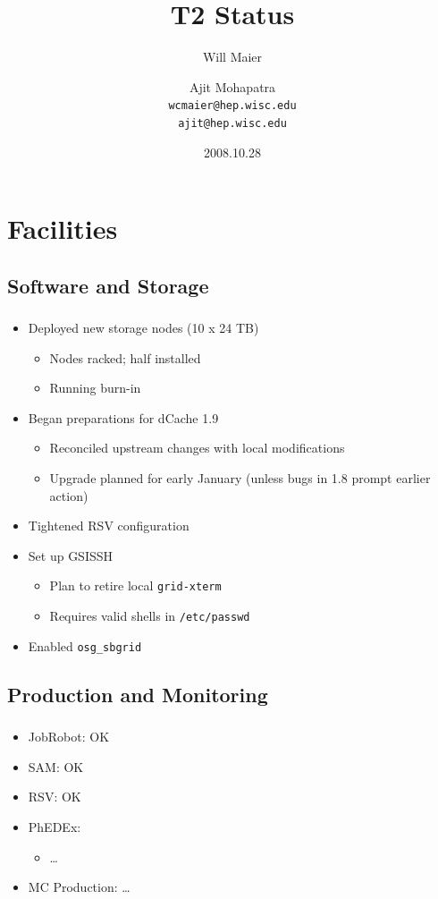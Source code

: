 \documentclass{beamer}
\title{T2 Status}
\author[Maier, Mohapatra]{
    Will Maier \and Ajit Mohapatra\\ 
    {\tt wcmaier@hep.wisc.edu}\\
    {\tt ajit@hep.wisc.edu}}
\institute[Wisconsin]{University of Wisconsin - High Energy Physics}
\date{2008.10.28}
\begin{document}
\begin{frame}
    \titlepage
\end{frame}


\section{Facilities}
\subsection{Software and Storage}
\begin{frame}
\frametitle{}
\begin{itemize}
    \item Deployed new storage nodes (10 x 24 TB)
    \begin{itemize}
        \item Nodes racked; half installed
        \item Running burn-in
    \end{itemize}
    \item Began preparations for dCache 1.9
    \begin{itemize}
        \item Reconciled upstream changes with local modifications
        \item Upgrade planned for early January (unless bugs in 1.8 prompt earlier action)
    \end{itemize}
    \item Tightened RSV configuration
    \item Set up GSISSH
    \begin{itemize}
        \item Plan to retire local {\tt grid-xterm}
        \item Requires valid shells in {\tt /etc/passwd}
    \end{itemize}
    \item Enabled {\tt osg\_sbgrid}
\end{itemize}
\end{frame}

\subsection{Production and Monitoring}
\begin{frame}
\frametitle{}
\begin{itemize}
     \item JobRobot: OK
     \item SAM: OK
     \item RSV: OK
     \item PhEDEx:
     \begin{itemize}
        \item \ldots{}
     \end{itemize}
     \item MC Production: \ldots{}
\end{itemize}
\end{frame}
\end{document}
